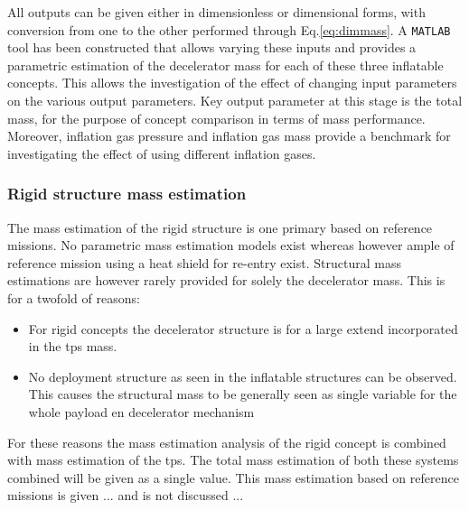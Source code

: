 All outputs can be given either in dimensionless or dimensional forms, with conversion from one to the other performed through Eq.\ref{eq:dimmass}. A \texttt{MATLAB} tool has been constructed that allows varying these inputs and provides a parametric estimation of the decelerator mass for each of these three inflatable concepts. This allows the investigation of the effect of changing input parameters on the various output parameters. Key output parameter at this stage is the total mass, for the purpose of concept comparison in terms of mass performance. Moreover, inflation gas pressure and inflation gas mass provide a benchmark for investigating the effect of using different inflation gases.


\subsubsection{Rigid structure mass estimation}

The mass estimation of the rigid structure is one primary based on reference missions. No parametric mass estimation models exist whereas however ample of reference mission using a heat shield for re-entry exist. Structural mass estimations are however rarely provided for solely the decelerator mass. This is for a twofold of reasons:

\begin{itemize}
\item For rigid concepts the decelerator structure is for a large extend incorporated in the \acrfull{tps} mass.
\item No deployment structure as seen in the inflatable structures can be observed. This causes the structural mass to be generally seen as single variable for the whole payload en decelerator mechanism
\end{itemize}

For these reasons the mass estimation analysis of the rigid concept is combined with mass estimation of the \acrfull{tps}. The total mass estimation of both these systems combined will be given as a single value. This mass estimation based on reference missions is given ... and is not discussed ...



